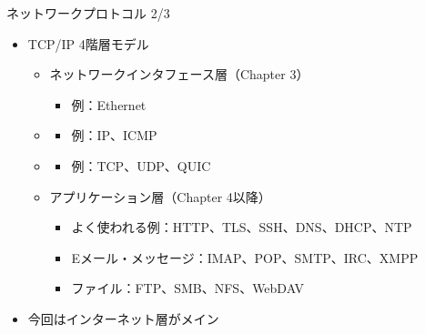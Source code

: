 \documentclass[12pt,aspectratio=169]{beamer}
\begin{document}
\begin{frame}{ネットワークプロトコル 2/3}

  \begin{itemize}
    \item TCP/IP 4階層モデル
      \begin{itemize}
        \item ネットワークインタフェース層（Chapter 3）
          \begin{itemize}
            \item 例：Ethernet
          \end{itemize}
        \item {}
          \begin{itemize}
            \item 例：IP、ICMP
          \end{itemize}
        \item {}
          \begin{itemize}
            \item 例：TCP、UDP、QUIC
          \end{itemize}
        \item アプリケーション層（Chapter 4以降）
          \begin{itemize}
            \item よく使われる例：HTTP、TLS、SSH、DNS、DHCP、NTP
            \item Eメール・メッセージ：IMAP、POP、SMTP、IRC、XMPP
            \item ファイル：FTP、SMB、NFS、WebDAV
          \end{itemize}

      \end{itemize}

    \item { \small 今回はインターネット層がメイン }

  \end{itemize}

\end{frame}
\end{document}
